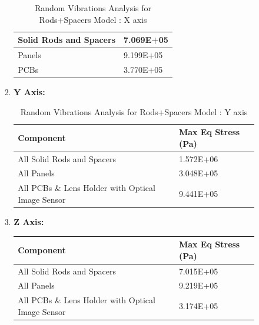 \documentclass[../../main.tex]{subfiles}
\begin{document}
\begin{enumerate}
\begin{enumerate}
\begin{enumerate}
\begin{enumerate}
\begin{table}[h!]
\begin{tabular}{|p{8cm}|p{3cm}|}
                        Solid Rods and Spacers & 7.069E+05 \\
                        \hline
                        Panels & 9.199E+05 \\
                        \hline
                        PCBs  & 3.770E+05 \\
                        \hline
                    \end{tabular}
                    \caption{Random Vibrations Analysis for Rods+Spacers Model : X axis}
                    \label{tab:my_label}
                \end{table}
        \item \textbf{Y Axis: }
                    \begin{table}[h!]
                    \centering
                    \begin{tabular}{|p{8cm}|p{3cm}|}
                        \hline
                        \textbf{Component} & \textbf{Max Eq Stress (Pa)} \\
                        \hline
                     All Solid Rods and Spacers & 1.572E+06 \\
                     \hline
                    All Panels & 3.048E+05 \\
                    \hline
                    All PCBs \& Lens Holder with Optical Image Sensor & 9.441E+05 \\

                        \hline
                    \end{tabular}
                    \caption{Random Vibrations Analysis for Rods+Spacers Model : Y axis}
                    \label{tab:my_label}
                    \end{table}
                                \item \textbf{Z Axis: }
                    \begin{table}[h!]
                    \centering
                    \begin{tabular}{|p{8cm}|p{3cm}|}
                        \hline
                        \textbf{Component} & \textbf{Max Eq Stress (Pa)} \\
                        \hline
                     All Solid Rods and Spacers & 7.015E+05 \\
                     \hline
                    All Panels & 9.219E+05 \\
                    \hline
                    All PCBs \& Lens Holder with Optical Image Sensor & 3.174E+05 \\


\end{tabular}
\end{table}
\end{enumerate}
\end{enumerate}
\end{enumerate}
\end{enumerate}
\end{document}
